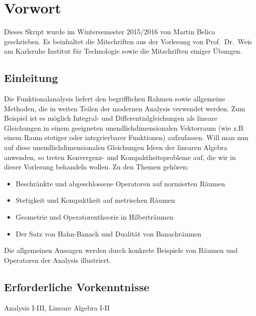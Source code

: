 
\chapter*{Vorwort}
Dieses Skript wurde im Wintersemester 2015/2016
von Martin Belica geschrieben. Es beinhaltet die Mitschriften aus
der Vorlesung von Prof.~Dr.~Weis am Karlsruhe Institut für Technologie sowie die Mitschriften einiger
Übungen.

\thispagestyle{empty}

\section*{Einleitung}

Die Funktionalanalysis liefert den begrifflichen Rahmen sowie allgemeine Methoden, die in weiten Teilen der modernen Analysis verwendet werden. Zum Beispiel ist es möglich Integral- und Differentialgleichungen als lineare Gleichungen in einem geeigneten unendlichdimensionalen Vektorraum (wie z.B. einem Raum stetiger oder integrierbarer Funktionen) aufzufassen. Will man nun auf diese unendlichdimensionalen Gleichungen Ideen der linearen Algebra anwenden, so treten Konvergenz- und Kompaktheitsprobleme auf, die wir in dieser Vorlesung behandeln wollen. Zu den Themen gehören:

  \begin{itemize}
     \item Beschränkte und abgeschlossene Operatoren auf normierten Räumen
     \item Stetigkeit und Kompaktheit auf metrischen Räumen
     \item Geometrie und Operatorentheorie in Hilberträumen
     \item Der Satz von Hahn-Banach und Dualität von Banachräumen    
  \end{itemize}
  
Die allgemeinen Aussagen werden durch konkrete Beispiele von Räumen und Operatoren der Analysis illustriert.

\section*{Erforderliche Vorkenntnisse}
Analysis I-III, Lineare Algebra I-II


\begin{center}	

\end{center}